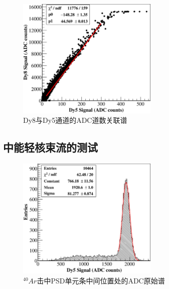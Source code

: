 \begin{figure}[!htbp]
	\centering
	\includegraphics[width=0.6\textwidth]{chap/dynamic_range/fig/dy58.eps}
	\caption{Dy8与Dy5通道的ADC道数关联谱}
	\label{fig:dynamic_range:dy58}
\end{figure}

\subsection{中能轻核束流的测试}
\label{sec:dynamic_range:ion_beam}

\begin{figure}[!htbp]
	\centering
	\includegraphics[width=0.6\textwidth]{chap/dynamic_range/fig/Ar.eps}
	\caption{$^{40}Ar$击中PSD单元条中间位置处的ADC原始谱}
	\label{fig:dynamic_range:Ar}
\end{figure}
